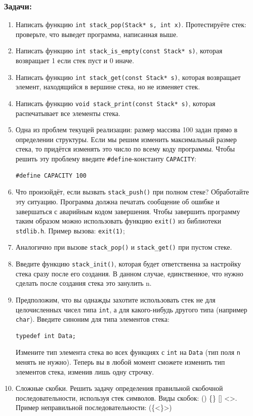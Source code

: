 \documentclass{article}
\begin{document}
\subsubsection*{Задачи:}
\begin{enumerate}
\item Написать функцию \texttt{int stack\_pop(Stack* s, int x)}. Протестируёте стек: проверьте, что выведет программа, написанная выше.
\item Написать функцию \texttt{int stack\_is\_empty(const Stack* s)}, которая возвращает 1 если стек пуст и 0 иначе.
\item Написать функцию \texttt{int stack\_get(const Stack* s)}, которая возвращает элемент, находящийся в вершине стека, но не изменяет стек.
\item Написать функцию \texttt{void stack\_print(const Stack* s)}, которая распечатывает все элементы стека.
\item Одна из проблем текущей реализации: размер массива 100 задан прямо в определении структуры. Если мы решим изменить максимальный размер стека, то придётся изменять это число по всему коду программы.  Чтобы решить эту проблему введите \texttt{\#define}-константу \texttt{CAPACITY}:
\begin{lstlisting}
#define CAPACITY 100
\end{lstlisting}
\item Что произойдёт, если вызвать \texttt{stack\_push()} при полном стеке? Обработайте эту ситуацию. Программа должна печатать сообщение об ошибке и завершаться с аварийным кодом завершения. Чтобы завершить программу таким образом можно использовать функцию \texttt{exit()} из библиотеки \texttt{stdlib.h}. Пример вызова: \texttt{exit(1)};
\item Аналогично при вызове \texttt{stack\_pop()} и \texttt{stack\_get()} при пустом стеке.
\item Введите функцию \texttt{stack\_init()}, которая будет ответственна за настройку стека сразу после его создания. В данном случае, единственное, что нужно сделать после создания стека это занулить n.
\item Предположим, что вы однажды захотите использовать стек не для целочисленных чисел типа \texttt{int}, а для какого-нибудь другого типа (например \texttt{char}). Введите синоним для типа элементов стека:
\begin{verbatim}
typedef int Data;
\end{verbatim}
Измените тип элемента стека во всех функциях с \texttt{int} на \texttt{Data} (тип поля \texttt{n} менять не нужно). Теперь вы в любой момент сможете изменить тип элементов стека, изменив лишь одну строчку.
\item Сложные скобки. Решить задачу определения правильной скобочной последовательности, используя стек символов. Виды скобок: () \{\} [] <>. Пример неправильной последовательности: (\{<\}>)
\end{enumerate}
\end{document}
